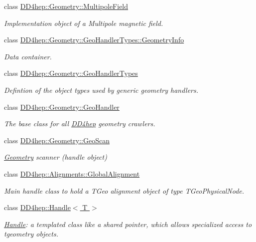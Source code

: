 \begin{DoxyCompactItemize}
class \hyperlink{class_d_d4hep_1_1_geometry_1_1_multipole_field}{D\+D4hep\+::\+Geometry\+::\+Multipole\+Field}
\begin{DoxyCompactList}\small\item\em Implementation object of a Multipole magnetic field. \end{DoxyCompactList}\item 
class \hyperlink{class_d_d4hep_1_1_geometry_1_1_geo_handler_types_1_1_geometry_info}{D\+D4hep\+::\+Geometry\+::\+Geo\+Handler\+Types\+::\+Geometry\+Info}
\begin{DoxyCompactList}\small\item\em Data container. \end{DoxyCompactList}\item 
class \hyperlink{class_d_d4hep_1_1_geometry_1_1_geo_handler_types}{D\+D4hep\+::\+Geometry\+::\+Geo\+Handler\+Types}
\begin{DoxyCompactList}\small\item\em Defintion of the object types used by generic geometry handlers. \end{DoxyCompactList}\item 
class \hyperlink{class_d_d4hep_1_1_geometry_1_1_geo_handler}{D\+D4hep\+::\+Geometry\+::\+Geo\+Handler}
\begin{DoxyCompactList}\small\item\em The base class for all \hyperlink{namespace_d_d4hep}{D\+D4hep} geometry crawlers. \end{DoxyCompactList}\item 
class \hyperlink{class_d_d4hep_1_1_geometry_1_1_geo_scan}{D\+D4hep\+::\+Geometry\+::\+Geo\+Scan}
\begin{DoxyCompactList}\small\item\em \hyperlink{namespace_d_d4hep_1_1_geometry}{Geometry} scanner (handle object) \end{DoxyCompactList}\item 
class \hyperlink{class_d_d4hep_1_1_alignments_1_1_global_alignment}{D\+D4hep\+::\+Alignments\+::\+Global\+Alignment}
\begin{DoxyCompactList}\small\item\em Main handle class to hold a T\+Geo alignment object of type T\+Geo\+Physical\+Node. \end{DoxyCompactList}\item 
class \hyperlink{class_d_d4hep_1_1_handle}{D\+D4hep\+::\+Handle$<$ T $>$}
\begin{DoxyCompactList}\small\item\em \hyperlink{class_d_d4hep_1_1_handle}{Handle}\+: a templated class like a shared pointer, which allows specialized access to tgeometry objects. \end{DoxyCompactList}\item 

\end{DoxyCompactItemize}
